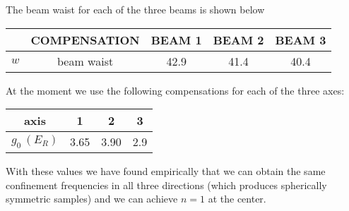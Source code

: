 The beam waist for each of the three beams is shown below
\begin{center}
\begin{tabular}{c|c|c|c|c}
      &  COMPENSATION & BEAM 1 & BEAM 2 & BEAM 3   \\ \hline \hline 
  $w  $ &  beam waist  & 42.9 & 41.4 & 40.4 \\
\end{tabular}
\end{center}





At the moment we use the following compensations for each of the three axes:
\begin{center}
\begin{tabular}{ c|c|c|c}
   axis & 1 & 2 & 3 \\
   \hline
   $g_{0}\ (E_{R})$ & 3.65 &  3.90 & 2.9 \\
\end{tabular}
\end{center}
With these values we have found empirically that we can obtain the same
confinement frequencies in all three directions (which produces spherically
symmetric samples) and we can achieve $n=1$ at the center. 


%


